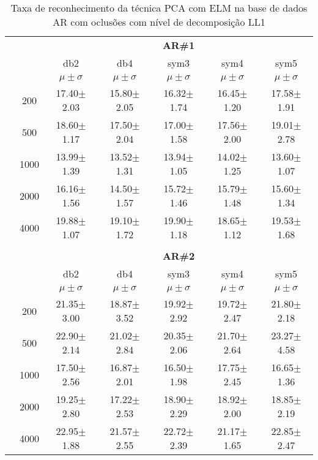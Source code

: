 \begin{table}[H] 
	\centering
    \normalsize
	\caption{Taxa de reconhecimento da técnica PCA com ELM na base de dados AR com oclusões com nível de decomposição LL1}
	\begin{tabular}{|c|c|c c c c c|}
\cline{3-7}
\multicolumn{2}{c|}{\multirow{3}{*}{}} & \multicolumn{5}{c|}{\textbf{AR\#1}}   \\\cline{3-7} 
\multicolumn{2}{c|}{}  & db2 & db4 & sym3 & sym4 & sym5 \\\cline{3-7}%
\multicolumn{2}{c|}{}& $\mu \pm \sigma$ & $\mu \pm \sigma$ & $\mu \pm \sigma$ & $\mu \pm \sigma$ & $\mu \pm \sigma$ \\\hline


\multicolumn{1}{|c|}{ \multirow{5}{*}{\rotatebox[origin=c]{90}{\textbf{Neurônios}}} }
&200	&17.40$\pm$2.03	&15.80$\pm$2.05	&16.32$\pm$1.74	&16.45$\pm$1.20 &17.58$\pm$1.91\\\cline{2-7}
&500	&18.60$\pm$1.17	&17.50$\pm$2.04	&17.00$\pm$1.58	&17.56$\pm$2.00	&19.01$\pm$2.78\\\cline{2-7}
&1000	&13.99$\pm$1.39	&13.52$\pm$1.31	&13.94$\pm$1.05	&14.02$\pm$1.25	&13.60$\pm$1.07\\\cline{2-7}
&2000	&16.16$\pm$1.56	&14.50$\pm$1.57	&15.72$\pm$1.46	&15.79$\pm$1.48	&15.60$\pm$1.34\\\cline{2-7}
&4000	&19.88$\pm$1.07	&19.10$\pm$1.72	&19.90$\pm$1.18	&18.65$\pm$1.12	&19.53$\pm$1.68
\\\midrule%

\multicolumn{7}{c}{}\\ 

\cline{3-7}
\multicolumn{2}{c|}{\multirow{3}{*}{}} & \multicolumn{5}{c|}{\textbf{AR\#2}}   \\\cline{3-7} 

\multicolumn{2}{c|}{}  & db2 & db4 & sym3 & sym4 & sym5 \\\cline{3-7}
\multicolumn{2}{c|}{}& $\mu \pm \sigma$ & $\mu \pm \sigma$ & $\mu \pm \sigma$ & $\mu \pm \sigma$ & $\mu \pm \sigma$ \\\hline


\multicolumn{1}{|c|}{ \multirow{5}{*}{\rotatebox[origin=c]{90}{\textbf{Neurônios}}} }
&200	&21.35$\pm$3.00	&18.87$\pm$3.52	&19.92$\pm$2.92	&19.72$\pm$2.47	&21.80$\pm$2.18\\\cline{2-7}
&500	&22.90$\pm$2.14	&21.02$\pm$2.84	&20.35$\pm$2.06	&21.70$\pm$2.64	&23.27$\pm$4.58\\\cline{2-7}
&1000	&17.50$\pm$2.56	&16.87$\pm$2.01	&16.50$\pm$1.98	&17.75$\pm$2.45	&16.65$\pm$1.36\\\cline{2-7}
&2000	&19.25$\pm$2.80	&17.22$\pm$2.53	&18.90$\pm$2.29	&18.92$\pm$2.00	&18.85$\pm$2.19\\\cline{2-7}
&4000	&22.95$\pm$1.88	&21.57$\pm$2.55	&22.72$\pm$2.39	&21.17$\pm$1.65	&22.85$\pm$2.47





\end{tabular}
\end{table}
